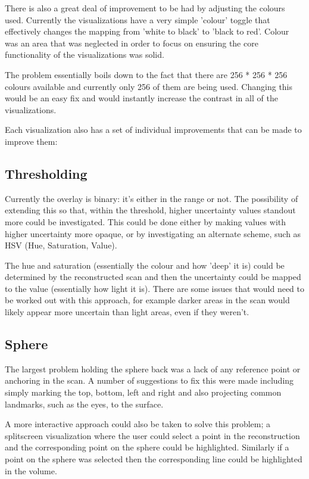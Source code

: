There is also a great deal of improvement to be had by adjusting the colours used. Currently the visualizations have a very simple 'colour' toggle that effectively changes the mapping from 'white to black' to 'black to red'. Colour was an area that was neglected in order to focus on ensuring the core functionality of the visualizations was solid.

The problem essentially boils down to the fact that there are 256 * 256 * 256 colours available and currently only 256 of them are being used. Changing this would be an easy fix and would instantly increase the contrast in all of the visualizations.

Each visualization also has a set of individual improvements that can be made to improve them:

\subsection*{Thresholding}
Currently the overlay is binary: it's either in the range or not. The possibility of extending this so that, within the threshold, higher uncertainty values standout more could be investigated. This could be done either by making values with higher uncertainty more opaque, or by investigating an alternate scheme, such as HSV (Hue, Saturation, Value). 

The hue and saturation (essentially the colour and how 'deep' it is) could be determined by the reconstructed scan and then the uncertainty could be mapped to the value (essentially how light it is). There are some issues that would need to be worked out with this approach, for example darker areas in the scan would likely appear more uncertain than light areas, even if they weren't.

\subsection*{Sphere}
The largest problem holding the sphere back was a lack of any reference point or anchoring in the scan. A number of suggestions to fix this were made including simply marking the top, bottom, left and right and also projecting common landmarks, such as the eyes, to the surface.

A more interactive approach could also be taken to solve this problem; a splitscreen visualization where the user could select a point in the reconstruction and the corresponding point on the sphere could be highlighted. Similarly if a point on the sphere was selected then the corresponding line could be highlighted in the volume.

